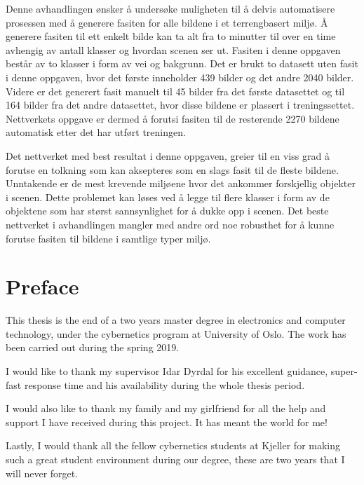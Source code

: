 \documentclass[USenglish]{ifimaster}  %
\begin{document}
Denne avhandlingen ønsker å undersøke muligheten til å delvis automatisere prosessen med å generere fasiten for alle bildene i et terrengbasert miljø. Å generere fasiten til ett enkelt bilde kan ta alt fra to minutter til over en time avhengig av antall klasser og hvordan scenen ser ut. Fasiten i denne oppgaven består av to klasser i form av vei og bakgrunn. Det er brukt to datasett uten fasit i denne oppgaven, hvor det første inneholder 439 bilder og det andre 2040 bilder. Videre er det generert fasit manuelt til 45 bilder fra det første datasettet og til 164 bilder fra det andre datasettet, hvor disse bildene er plassert i treningssettet. Nettverkets oppgave er dermed å forutsi fasiten til de resterende 2270 bildene automatisk etter det har utført treningen.   

Det nettverket med best resultat i denne oppgaven, greier til en viss grad å forutse en tolkning som kan aksepteres som en slags fasit til de fleste bildene. Unntakende er de mest krevende miljøene hvor det ankommer forskjellig objekter i scenen. Dette problemet kan løses ved å legge til flere klasser i form av de objektene som har størst sannsynlighet for å dukke opp i scenen. Det beste nettverket i avhandlingen mangler med andre ord noe robusthet for å kunne forutse fasiten til bildene i samtlige typer miljø. 

\chapter*{Preface}
This thesis is the end of a two years master degree in electronics and computer technology, under the cybernetics program at University of Oslo. The work has been carried out during the spring 2019.

I would like to thank my supervisor Idar Dyrdal for his excellent guidance, super-fast response time and his availability during the whole thesis period. 

I would also like to thank my family and my girlfriend for all the help and support I have received during this project. It has meant the world for me!

Lastly, I would thank all the fellow cybernetics students at Kjeller for making such a great student environment during our degree, these are two years that I will never forget.  

\tableofcontents{}
\listoffigures{}
\listoftables{}
\end{document}
